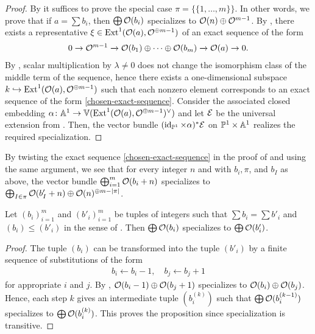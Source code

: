 \begin{proof}
	By  it suffices to prove the special case $\pi = \{\{1,\dotsc,m\}\}$. In other words, we prove that if $a = \sum b_i$, then $\bigoplus\mathcal{O}(b_i)$ specializes to $\mathcal{O}(n)\oplus \mathcal{O}^{m-1}$. By , there exists a representative $\xi \in \operatorname{Ext}^1(\mathcal{O}(a),\mathcal{O}^{\oplus m-1})$ of an exact sequence of the form
	\begin{align} \label{chosen-exact-sequence}
		\sesarrows{\mc{O}^{m-1}}{}{\mc{O}(b_1)\oplus \dotsb \oplus \mc{O}(b_m)}{}{\mc{O}(a)}. %
	\end{align}
	By , scalar multiplication by $\lambda \neq 0$ does not change the isomorphism class of the middle term of the sequence, hence there exists a one-dimensional subspace $k \injectto \Ext^1(\mc{O}(a),\mc{O}^{\oplus m-1})$ such that each nonzero element corresponds to an exact sequence of the form
	\cref{chosen-exact-sequence}. Consider the associated closed embedding $\alpha \colon \mathbb{A}^1 \to \mathbb{V}(\operatorname{Ext}^1(\mathcal{O}(a),\mathcal{O}^{\oplus m-1})^\vee)$ and let $\mathcal{E}$ be the universal extension from . Then, the vector bundle $(\operatorname{id}_{\mathbb{P}^1}\times\alpha)^{*}\mathcal{E}$ on $\mathbb{P}^1\times\mathbb{A}^1$ realizes the required specialization. 
\end{proof}

\begin{remark} \label{my-specialization}
	By twisting the exact sequence \cref{chosen-exact-sequence} in the proof of  and using the same argument, we see that for every integer $n$ and with $b_i, \pi$, and $b_I$ as above, the vector bundle $\bigoplus_{i=1}^m \mathcal{O} (b_i+n)$ specializes to $\bigoplus_{I\in\pi} \mathcal{O}(b'_I+n) \oplus \mathcal{O}(n)^{\oplus m-\lvert\pi\rvert}$.
\end{remark}

\begin{proposition}
	Let $(b_i)_{i=1}^m$ and $(b'_i)_{i=1}^m$ be tuples of integers such that $\sum b_i = \sum b'_i$ and $(b_i)\leq (b'_i)$ in the sense of . Then $\bigoplus \mathcal{O}(b_i)$ specializes to $\bigoplus \mathcal{O}(b'_i)$.
\end{proposition}

\begin{proof}
	The tuple $(b_i)$ can be transformed into the tuple $(b'_i)$ by a finite sequence of substitutions of the form
	\begin{align*}
		b_i \leftarrow b_i - 1, \quad
		b_{j} \leftarrow b_{j} +1
	\end{align*}
	for appropriate $i$ and $j$. By , $\mathcal{O}(b_i - 1) \oplus \mathcal{O}(b_j + 1)$ specializes to $\mathcal{O}(b_i) \oplus \mathcal{O}(b_j)$. Hence, each step $k$ gives an intermediate tuple $(b_i^{(k)})$ such that $\bigoplus \mathcal{O}(b_i^{(k-1)})$ specializes to $\bigoplus \mathcal{O}(b_i^{(k)})$. This proves the proposition since specialization is transitive.
\end{proof}